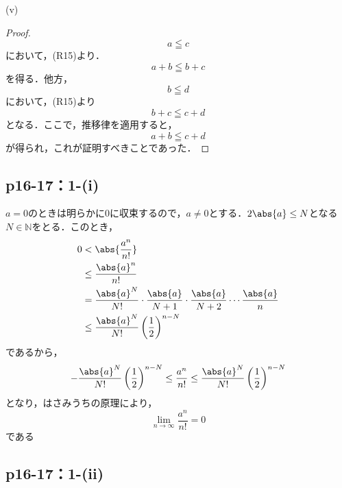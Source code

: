\documentclass[uplatex,dvipdfmx,a4paper,10pt,fleqn]{jsarticle}
\begin{document}
        \begin{itembox}[c]{(v)}
            \begin{proof}
                \[
                    a \leqq c
                \]
                において，(R15)より．
                \[
                    a+b \leqq b+c
                \]
                を得る．他方，
                \[
                    b \leqq d
                \]
                において，(R15)より
                \[
                    b + c \leqq c+d
                \]
                となる．ここで，推移律を適用すると，
                \[
                    a+b \leqq c+d
                \]
                が得られ，これが証明すべきことであった．
            \end{proof}
            \end{itembox}
%
\subsection*{p16-17：1-(i)}

\begin{tleftbar}
    $a=0$のときは明らかに$0$に収束するので，$a \ne 0$とする．$2\abs{a} \le N$となる$N \in \mathbb{N}$をとる．このとき，
    \begin{align*}
         0 &< \abs{ \frac{a^n}{n!} } \\
         &\le \frac{\abs{a}^n}{n!} \\
         &= \frac{\abs{a}^{N}}{N!} \cdot \frac{\abs{a}}{N+1} \cdot \frac{\abs{a}}{N+2} \dotsm \frac{\abs{a}}{n} \\
         & \le  \frac{\abs{a}^{N}}{N!} \left(\frac{1}{2} \right)^{n-N}
    \end{align*}
    であるから，
    \[
        - \frac{\abs{a}^{N}}{N!} \left(\frac{1}{2} \right)^{n-N} \le  \frac{a^n}{n!} \le \frac{\abs{a}^{N}}{N!} \left(\frac{1}{2} \right)^{n-N}
    \]
    となり，はさみうちの原理により，
    \[
        \lim_{n \to \infty} \frac{a^n}{n!} =0
    \]
    である
\end{tleftbar}

\subsection*{p16-17：1-(ii)}
\end{document}

